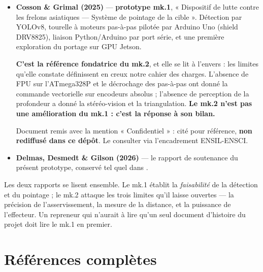 \documentclass[11pt,a4paper]{article}
\begin{document}
\begin{itemize}[leftmargin=*]
  \item \textbf{Cosson \& Grimal (2025)} \cite{cosson2025vespa_mk1} — \textbf{prototype
        mk.1}, « Dispositif de lutte contre les frelons asiatiques — Système de pointage de
        la cible ». Détection par YOLOv8, tourelle à moteurs pas-à-pas pilotée par Arduino
        Uno (shield DRV8825), liaison Python/Arduino par port série, et une première
        exploration du portage sur GPU Jetson.

        \textbf{C'est la référence fondatrice du mk.2}, et elle se lit à l'envers : les
        limites qu'elle constate définissent en creux notre cahier des charges. L'absence de
        FPU sur l'ATmega328P et le décrochage des pas-à-pas ont donné la commande vectorielle
        sur encodeurs absolus ; l'absence de perception de la profondeur a donné la
        stéréo-vision et la triangulation. \textbf{Le mk.2 n'est pas une amélioration du
        mk.1 : c'est la réponse à son bilan.}

        Document remis avec la mention « Confidentiel » : cité pour référence,
        \textbf{non rediffusé dans ce dépôt}. Le consulter via l'encadrement ENSIL-ENSCI.

  \item \textbf{Delmas, Desmedt \& Gilson (2026)} \cite{delmas2026vespa_mk2} — le rapport de
        soutenance du présent prototype, conservé tel quel dans
        .
\end{itemize}

\begin{note}
Les deux rapports se lisent ensemble. Le mk.1 établit la \emph{faisabilité} de la détection
et du pointage ; le mk.2 attaque les trois limites qu'il laisse ouvertes — la précision de
l'asservissement, la mesure de la distance, et la puissance de l'effecteur. Un repreneur qui
n'aurait à lire qu'un seul document d'histoire du projet doit lire le mk.1 en premier.
\end{note}

\newpage
\section*{Références complètes}

\nocite{*}


\end{document}
